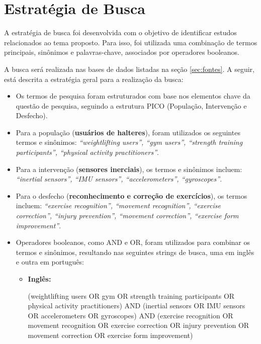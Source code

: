 \documentclass[a4paper,12pt]{article}
\begin{document}
\section{Estratégia de Busca}
\label{sec:estrategia_busca}

A estratégia de busca foi desenvolvida com o objetivo de identificar estudos relacionados ao tema proposto. Para isso, foi utilizada uma combinação de termos principais, sinônimos e palavras-chave, associados por operadores booleanos.

A busca será realizada nas bases de dados listadas na seção \ref{sec:fontes}. A seguir, está descrita a estratégia geral para a realização da busca:

\begin{itemize}
    \item Os termos de pesquisa foram estruturados com base nos elementos chave da questão de pesquisa, seguindo a estrutura PICO (População, Intervenção e Desfecho).
    
    \item Para a população (\textbf{usuários de halteres}), foram utilizados os seguintes termos e sinônimos: \textit{“weightlifting users”, “gym users”, “strength training participants”, “physical activity practitioners”}.
    
    \item Para a intervenção (\textbf{sensores inerciais}), os termos e sinônimos incluem: \textit{“inertial sensors”, “IMU sensors”, “accelerometers”, “gyroscopes”}.
    
    \item Para o desfecho (\textbf{reconhecimento e correção de exercícios}), os termos incluem: \textit{“exercise recognition”, “movement recognition”, “exercise correction”, “injury prevention”, “movement correction”, “exercise form improvement”}.
    
    \item Operadores booleanos, como AND e OR, foram utilizados para combinar os termos e sinônimos, resultando nas seguintes strings de busca, uma em inglês e outra em português:
    
    \begin{itemize}
        \item \textbf{Inglês:} \newline
        \begin{RaggedRight}
        (weightlifting users OR gym OR strength training participants OR physical activity practitioners) AND (inertial sensors OR IMU sensors OR accelerometers OR gyroscopes) AND (exercise recognition OR movement recognition OR exercise correction OR injury prevention OR movement correction OR exercise form improvement)
        \end{RaggedRight}
        

\end{itemize}
\end{itemize}
\end{document}
